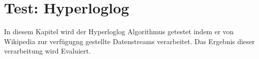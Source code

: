 \section{Test: Hyperloglog}
In diesem Kapitel wird der Hyperloglog Algorithmus getestet indem er von Wikipedia zur verfügugng gestellte Datenstreams verarbeitet. Das Ergebnis dieser verarbeitung wird Evaluiert. 